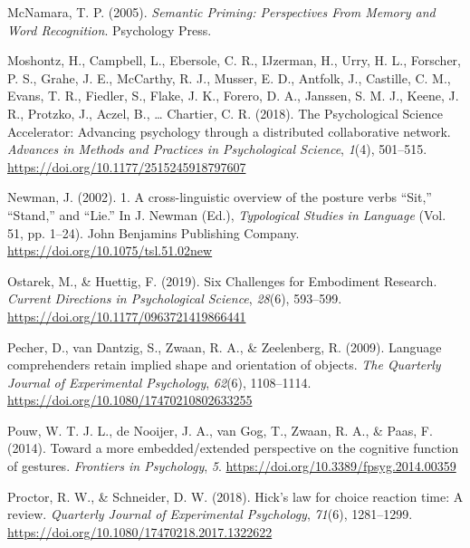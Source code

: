 \documentclass[
  man]{apa7}
\newlength{\cslhangindent}
\newlength{\cslentryspacingunit} %
\newenvironment{CSLReferences}[2] %
 {%
  \setlength{\parindent}{0pt}
  \ifodd #1
  \let\oldpar\par
  \def\par{\hangindent=\cslhangindent\oldpar}
  \fi
  \setlength{\parskip}{#2\cslentryspacingunit}
 }%
 {}
\begin{document}
\begin{CSLReferences}{1}{0}
\leavevmode{}%
McNamara, T. P. (2005). \emph{Semantic {Priming}: {Perspectives From Memory} and {Word Recognition}}. {Psychology Press}.

\leavevmode{}%
Moshontz, H., Campbell, L., Ebersole, C. R., IJzerman, H., Urry, H. L., Forscher, P. S., Grahe, J. E., McCarthy, R. J., Musser, E. D., Antfolk, J., Castille, C. M., Evans, T. R., Fiedler, S., Flake, J. K., Forero, D. A., Janssen, S. M. J., Keene, J. R., Protzko, J., Aczel, B., \ldots{} Chartier, C. R. (2018). The {Psychological Science Accelerator}: {Advancing} psychology through a distributed collaborative network. \emph{Advances in Methods and Practices in Psychological Science}, \emph{1}(4), 501--515. \url{https://doi.org/10.1177/2515245918797607}

\leavevmode{}%
Newman, J. (2002). 1. {A} cross-linguistic overview of the posture verbs {``{Sit},''} {``{Stand},''} and {``{Lie}.''} In J. Newman (Ed.), \emph{Typological {Studies} in {Language}} (Vol. 51, pp. 1--24). {John Benjamins Publishing Company}. \url{https://doi.org/10.1075/tsl.51.02new}

\leavevmode{}%
Ostarek, M., \& Huettig, F. (2019). Six {Challenges} for {Embodiment Research}. \emph{Current Directions in Psychological Science}, \emph{28}(6), 593--599. \url{https://doi.org/10.1177/0963721419866441}

\leavevmode{}%
Pecher, D., van Dantzig, S., Zwaan, R. A., \& Zeelenberg, R. (2009). Language comprehenders retain implied shape and orientation of objects. \emph{The Quarterly Journal of Experimental Psychology}, \emph{62}(6), 1108--1114. \url{https://doi.org/10.1080/17470210802633255}

\leavevmode{}%
Pouw, W. T. J. L., de Nooijer, J. A., van Gog, T., Zwaan, R. A., \& Paas, F. (2014). Toward a more embedded/extended perspective on the cognitive function of gestures. \emph{Frontiers in Psychology}, \emph{5}. \url{https://doi.org/10.3389/fpsyg.2014.00359}

\leavevmode{}%
Proctor, R. W., \& Schneider, D. W. (2018). Hick's law for choice reaction time: {A} review. \emph{Quarterly Journal of Experimental Psychology}, \emph{71}(6), 1281--1299. \url{https://doi.org/10.1080/17470218.2017.1322622}


\end{CSLReferences}
\end{document}
